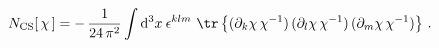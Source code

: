 \begin{equation}
N_\mathrm{CS}[\, \chi\,]= -
   \,\frac{1}{24\,\pi^2} \int {\rm d}^3x\: \epsilon^{klm} \,\, \tr\left\{
  (\partial_k \chi\,\chi^{-1}) \,
  (\partial_l \chi\,\chi^{-1}) \,
  (\partial_m \chi\,\chi^{-1}) \right\} \,.
\end{equation}

